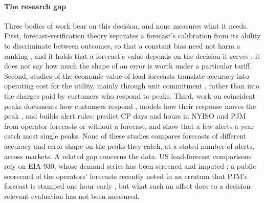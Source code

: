 \documentclass[preprint,12pt,authoryear]{elsarticle}
\begin{document}
\paragraph{The research gap} Three bodies of work bear on this decision, and none measures what it needs. First, forecast-verification theory separates a forecast's calibration from its ability to discriminate between outcomes, so that a constant bias need not harm a ranking \citep{murphy1987general}, and it holds that a forecast's value depends on the decision it serves \citep{murphy1993good,gneiting2011point}; it does not say how much the shape of an error is worth under a particular tariff. Second, studies of the economic value of load forecasts translate accuracy into operating cost for the utility, mainly through unit commitment \citep{ranaweera1997economic,hobbs1999value}, rather than into the charges paid by customers who respond to peaks. Third, work on coincident peaks documents how customers respond \citep{zarnikau2013response,liu2013datacenter}, models how their response moves the peak \citep{zhang2026cp}, and builds alert rules: \citet{carmona2026cp} predict CP days and hours in NYISO and PJM from operator forecasts or without a forecast, and show that a few alerts a year catch most single peaks. None of these studies compares forecasts of different accuracy and error shape on the peaks they catch, at a stated number of alerts, across markets. A related gap concerns the data. US load-forecast comparisons rely on EIA-930, whose demand series has been screened and imputed \citep{ruggles2020eia}; a public scorecard of the operators' forecasts recently noted in an erratum that PJM's forecast is stamped one hour early \citep{guerrafilho2026scorecard}, but what such an offset does to a decision-relevant evaluation has not been measured.
\end{document}
